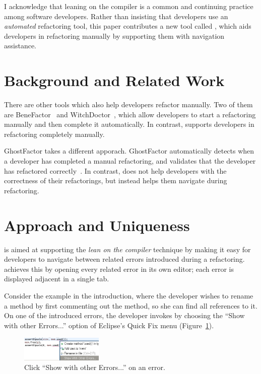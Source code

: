 \documentclass{sigplanconf}
\begin{document}
I acknowledge that leaning on the compiler is a common and continuing practice
among software developers. Rather than insisting that developers use an
\textit{automated} refactoring tool, this paper contributes a new tool
called \pname{}, which aids developers in refactoring
manually by supporting them with navigation assistance.

\section{Background and Related Work}
There are other tools which also help developers refactor manually. Two of them
are
BeneFactor~\cite{bene-factor} and WitchDoctor~\cite{witch-doctor},
which allow developers to start a refactoring manually and then
complete it automatically.
In contrast, \pname{} supports developers in refactoring completely manually.

GhostFactor takes a different apporach. GhostFactor automatically detects
when a developer has completed a manual refactoring, and validates
that the developer has refactored correctly~\cite{ghost-factor}.
In contrast, \pname{} does not help developers with the correctness of
their refactorings, but instead helps them navigate during refactoring.

\section{Approach and Uniqueness}
\pname{} is aimed at supporting the \textit{lean on the compiler} technique
by making it easy for developers to navigate between related errors introduced
during a refactoring. \pname{} achieves this by opening every related error
in its own editor; each error is displayed adjacent in a single tab.

Consider the example in the introduction, where the developer
wishes to rename a method by first commenting out
the method, so she can find all references to it.
On one of the introduced errors, the developer invokes \pname{} by choosing
the ``Show with other Errors...'' option of Eclipse's Quick Fix
menu (Figure~\ref{quick}).

\begin{figure}[h]
\begin{center}
\includegraphics[width=0.35\textwidth]{quick-fix.png}
\caption{Click ``Show with other Errors...'' on an error.\label{quick}}
\end{center}
\end{figure}
\end{document}
